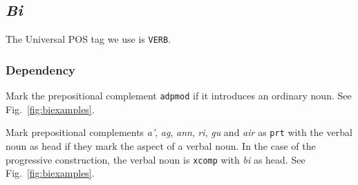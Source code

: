 \documentclass[a4paper]{article}
\begin{document}
\subsection{\textit{Bi}\label{subsect:bi}}

The Universal POS tag we use is \texttt{VERB}.

\subsubsection*{Dependency}

 Mark the prepositional complement \texttt{adpmod} if it introduces an ordinary noun. See Fig.~\ref{fig:biexamples}.

 Mark prepositional complements \textit{a'}, \textit{ag}, \textit{ann}, \textit{ri}, \textit{gu} and \textit{air} as \texttt{prt} with the verbal noun as head if they mark the aspect of a verbal noun.
In the case of the progressive construction, the verbal noun is \texttt{xcomp} with \textit{bi} as head.
See Fig.~\ref{fig:biexamples}.
\end{document}
